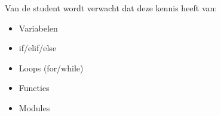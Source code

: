 Van de student wordt verwacht dat deze kennis heeft van:
\begin{itemize}
\item Variabelen
\item if/elif/else
\item Loops (for/while)
\item Functies
\item Modules
\end{itemize}

